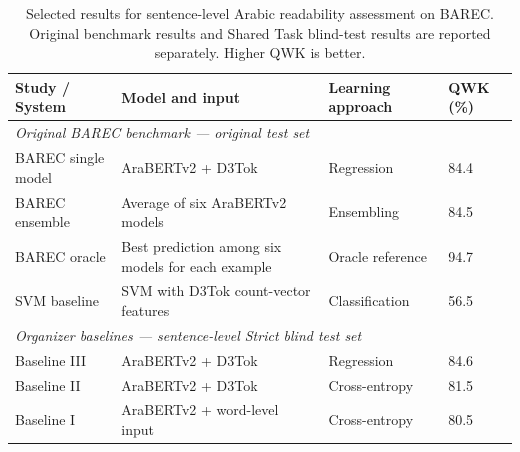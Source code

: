 \documentclass[12pt]{report}
\begin{document}
\begin{table}[htbp]
\centering
\scriptsize
\caption{Selected results for sentence-level Arabic readability assessment on BAREC. Original benchmark results and Shared Task blind-test results are reported separately. Higher QWK is better.}
\label{tab:barec_systems}
\begin{tabular}{p{2.2cm} p{4.0cm} p{3.0cm} p{1.6cm}}
\toprule
\textbf{Study / System} &
\textbf{Model and input} &
\textbf{Learning approach} &
\textbf{QWK (\%)} \\
\midrule

\multicolumn{4}{l}{\textit{Original BAREC benchmark --- original test set}} \\
\midrule
BAREC single model &
AraBERTv2 + D3Tok &
Regression &
84.4 \\
BAREC ensemble &
Average of six AraBERTv2 models &
Ensembling &
84.5 \\
BAREC oracle &
Best prediction among six models for each example &
Oracle reference &
94.7 \\
SVM baseline &
SVM with D3Tok count-vector features &
Classification &
56.5 \\
\midrule

\multicolumn{4}{l}{\textit{Organizer baselines --- sentence-level Strict blind test set}} \\
\midrule
Baseline III &
AraBERTv2 + D3Tok &
Regression &
84.6 \\
Baseline II &
AraBERTv2 + D3Tok &
Cross-entropy &
81.5 \\
Baseline I &
AraBERTv2 + word-level input &
Cross-entropy &
80.5 \\
\midrule


\end{tabular}
\end{table}
\end{document}

